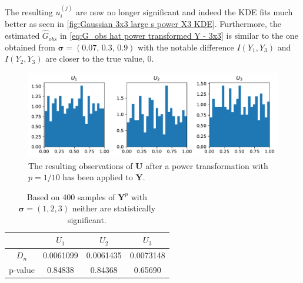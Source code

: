 \documentclass[../Thesis.tex]{subfiles}
\begin{document}



The resulting $u_i^{(j)}$ are now no longer significant and indeed the KDE fits much better as seen in \autoref{fig:Gaussian 3x3 large s power X3 KDE}. Furthermore, the estimated $\hat{G}_{obs}$ in \autoref{eq:G_obs hat power transformed Y - 3x3} is similar to the one obtained from $\boldsymbol \sigma = \left(0.07,\, 0.3,\, 0.9\right)$ with the notable difference $I(Y_1,Y_3)$ and $I(Y_2,Y_3)$ are closer to the true value, $0$.
\begin{figure}[H]
    \centering
    \includegraphics[width=0.99\linewidth]{figures/ND examples/Gaussian 3x3 large s power uniforms.pdf}
    \caption{The resulting observations of $\boldsymbol U$ after a power transformation with $p = 1/10$ has been applied to $\boldsymbol Y$.}
    \label{fig:Gaussian 3x3 large s power uniforms}
\end{figure}
\begin{table}[ht]
    \centering
    \begin{tabular}{c|c|c|c}
                & $U_1$     & $U_2$     & $U_3$     \\\hline
        $D_n$   & 0.0061099 & 0.0061435 & 0.0073148 \\
        p-value & 0.84838   & 0.84368   & 0.65690
    \end{tabular}
    \caption{Based on 400 samples of $\boldsymbol Y^p $ with $\boldsymbol\sigma = (1, 2, 3)$ neither are statistically significant.}
    \label{tab:Results - 3x3 case - large s KS test - transformed}
\end{table}
\end{document}
